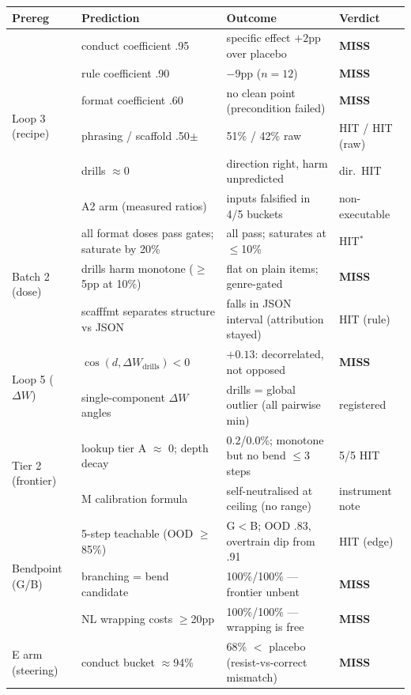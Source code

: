 \begin{table}[h]
\centering\small
\begin{tabular}{llll}
\toprule
Prereg & Prediction & Outcome & Verdict \\
\midrule
\multirow{6}{*}{Loop 3 (recipe)}
 & conduct coefficient .95 & specific effect $+2$pp over placebo & \textbf{MISS} \\
 & rule coefficient .90 & $-9$pp ($n{=}12$) & \textbf{MISS} \\
 & format coefficient .60 & no clean point (precondition failed) & \textbf{MISS} \\
 & phrasing / scaffold .50$\pm$ & 51\% / 42\% raw & HIT / HIT (raw) \\
 & drills $\approx 0$ & direction right, harm unpredicted & dir.\ HIT \\
 & A2 arm (measured ratios) & inputs falsified in 4/5 buckets & non-executable \\
\midrule
\multirow{3}{*}{Batch 2 (dose)}
 & all format doses pass gates; saturate by 20\% & all pass; saturates at $\leq$10\% & HIT$^{*}$ \\
 & drills harm monotone ($\geq$5pp at 10\%) & flat on plain items; genre-gated & \textbf{MISS} \\
 & scafffmt separates structure vs JSON & falls in JSON interval (attribution stayed) & HIT (rule) \\
\midrule
\multirow{2}{*}{Loop 5 ($\Delta W$)}
 & $\cos(d, \Delta W_{\text{drills}}) < 0$ & $+0.13$: decorrelated, not opposed & \textbf{MISS} \\
 & single-component $\Delta W$ angles & drills = global outlier (all pairwise min) & registered \\
\midrule
\multirow{2}{*}{Tier 2 (frontier)}
 & lookup tier A $\approx$ 0; depth decay & 0.2/0.0\%; monotone but no bend $\leq$3 steps & 5/5 HIT \\
 & M calibration formula & self-neutralised at ceiling (no range) & instrument note \\
\midrule
\multirow{3}{*}{Bendpoint (G/B)}
 & 5-step teachable (OOD $\geq$85\%) & G$<$B; OOD .83, overtrain dip from .91 & HIT (edge) \\
 & branching = bend candidate & 100\%/100\% --- frontier unbent & \textbf{MISS} \\
 & NL wrapping costs $\geq$20pp & 100\%/100\% --- wrapping is free & \textbf{MISS} \\
\midrule
\multirow{2}{*}{E arm (steering)}
 & conduct bucket $\approx$94\% & 68\% $<$ placebo (resist-vs-correct mismatch) & \textbf{MISS} \\

\end{tabular}
\end{table}
